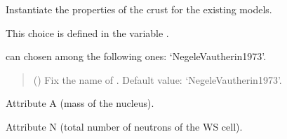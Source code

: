 \documentclass[letterpaper,10pt,english]{sphinxmanual}
\begin{document}
\begin{fulllineitems}
\label{\detokenize{source/api/setup_crust:nucleardatapy.setup_crust.SetupCrust}}
\pysigstartsignatures
{}
\pysigstopsignatures
\sphinxAtStartPar
Instantiate the properties of the crust for the existing models.

\sphinxAtStartPar
This choice is defined in the variable .

\sphinxAtStartPar
{} can chosen among the following ones: ‘Negele\sphinxhyphen{}Vautherin\sphinxhyphen{}1973’.
\begin{quote}\begin{description}
\sphinxAtStartPar
{} (\sphinxstyleliteralemphasis{\sphinxupquote{, }}) \textendash{} Fix the name of . Default value: ‘Negele\sphinxhyphen{}Vautherin\sphinxhyphen{}1973’.

\end{description}\end{quote}

\sphinxAtStartPar
{}

\begin{fulllineitems}
\label{\detokenize{source/api/setup_crust:nucleardatapy.setup_crust.SetupCrust.A}}
\pysigstartsignatures
{}
\pysigstopsignatures
\sphinxAtStartPar
Attribute A (mass of the nucleus).

\end{fulllineitems}


\begin{fulllineitems}
\label{\detokenize{source/api/setup_crust:nucleardatapy.setup_crust.SetupCrust.N}}
\pysigstartsignatures
{}
\pysigstopsignatures
\sphinxAtStartPar
Attribute N (total number of neutrons of the WS cell).


\end{fulllineitems}
\end{fulllineitems}
\end{document}
